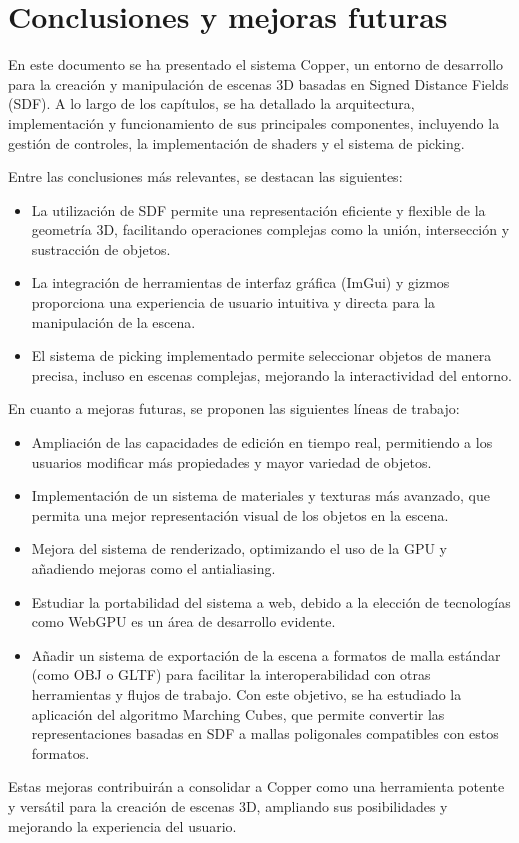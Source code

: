 \chapter{Conclusiones y mejoras futuras}

En este documento se ha presentado el sistema Copper, un entorno de desarrollo
para la creación y manipulación de escenas 3D basadas en Signed Distance Fields
(SDF). A lo largo de los capítulos, se ha detallado la arquitectura,
implementación y funcionamiento de sus principales componentes, incluyendo la
gestión de controles, la implementación de shaders y el sistema de picking.

Entre las conclusiones más relevantes, se destacan las siguientes:

\begin{itemize}
      \item La utilización de SDF permite una representación eficiente y flexible de la
            geometría 3D, facilitando operaciones complejas como la unión, intersección y
            sustracción de objetos.
      \item La integración de herramientas de interfaz gráfica (ImGui) y gizmos proporciona
            una experiencia de usuario intuitiva y directa para la manipulación de la
            escena.
      \item El sistema de picking implementado permite seleccionar objetos de manera
            precisa, incluso en escenas complejas, mejorando la interactividad del entorno.
\end{itemize}

En cuanto a mejoras futuras, se proponen las siguientes líneas de trabajo:

\begin{itemize}
      \item Ampliación de las capacidades de edición en tiempo real, permitiendo a los
            usuarios modificar más propiedades y mayor variedad de objetos.
      \item Implementación de un sistema de materiales y texturas más avanzado, que permita
            una mejor representación visual de los objetos en la escena.
      \item Mejora del sistema de renderizado, optimizando el uso de la GPU y añadiendo
            mejoras como el antialiasing.
      \item Estudiar la portabilidad del sistema a web, debido a la elección de tecnologías
            como WebGPU es un área de desarrollo evidente.
      \item Añadir un sistema de exportación de la escena a formatos de malla estándar
            (como OBJ o GLTF) para facilitar la interoperabilidad con otras herramientas y
            flujos de trabajo. Con este objetivo, se ha estudiado la aplicación del
            algoritmo Marching Cubes, que permite convertir las representaciones basadas en
            SDF a mallas poligonales compatibles con estos formatos.
\end{itemize}

Estas mejoras contribuirán a consolidar a Copper como una herramienta potente y
versátil para la creación de escenas 3D, ampliando sus posibilidades y
mejorando la experiencia del usuario.
